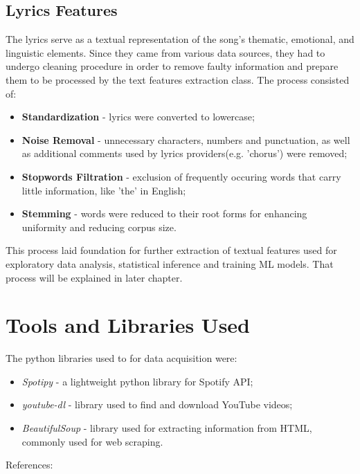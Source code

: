 \subsection{Lyrics Features}
 The lyrics serve as a textual representation of the song's thematic,
 emotional, and linguistic elements. Since they came from various data sources,
 they had  to undergo cleaning procedure in order to remove faulty information
 and prepare them to be processed by the text features extraction class. The
 process consisted of:
 \begin{itemize}
  \item \textbf{Standardization} - lyrics were converted to lowercase;
  \item \textbf{Noise Removal} - unnecessary characters, numbers and
    punctuation, as well as additional comments used by lyrics providers(e.g.
    'chorus') were removed;
  \item \textbf{Stopwords Filtration} - exclusion of frequently occuring words
    that carry little information, like 'the' in English;
  \item \textbf{Stemming} - words were reduced to their root forms for enhancing
    uniformity and reducing corpus size.
 \end{itemize}

 This process laid foundation for further extraction of textual features used
 for exploratory data analysis, statistical inference and training ML models.
 That process will be explained in later chapter.



\section{Tools and Libraries Used}
\label{sec:toolsandlibrariesused}
The python libraries used to for data acquisition were:
\begin{itemize}
  \item \textit{Spotipy} - a lightweight python library for
    Spotify API;
  \item \textit{youtube-dl}  - library used to find and download
    YouTube videos;
  \item \textit{BeautifulSoup}  - library used for
    extracting information from HTML, commonly used for web scraping.
\end{itemize}

References: \cite{spotipy} \cite{ytdl} \cite{beautifulsoup}


